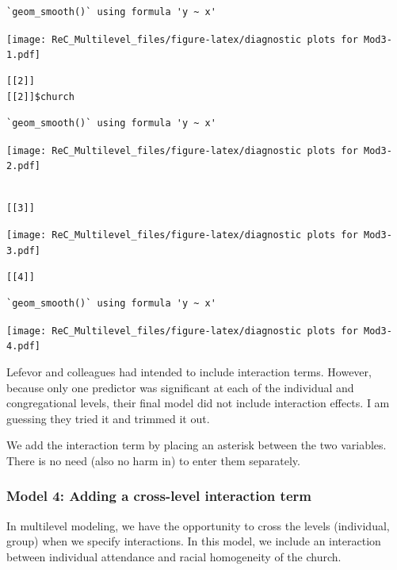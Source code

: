 \documentclass[
  11pt,
]{book}
\begin{document}
\begin{verbatim}
`geom_smooth()` using formula 'y ~ x'
\end{verbatim}

\texttt{[image: ReC\_Multilevel\_files/figure-latex/diagnostic plots for Mod3-1.pdf]}

\begin{verbatim}
[[2]]
[[2]]$church
\end{verbatim}

\begin{verbatim}
`geom_smooth()` using formula 'y ~ x'
\end{verbatim}

\texttt{[image: ReC\_Multilevel\_files/figure-latex/diagnostic plots for Mod3-2.pdf]}

\begin{verbatim}

[[3]]
\end{verbatim}

\texttt{[image: ReC\_Multilevel\_files/figure-latex/diagnostic plots for Mod3-3.pdf]}

\begin{verbatim}
[[4]]
\end{verbatim}

\begin{verbatim}
`geom_smooth()` using formula 'y ~ x'
\end{verbatim}

\texttt{[image: ReC\_Multilevel\_files/figure-latex/diagnostic plots for Mod3-4.pdf]}

Lefevor and colleagues \citep{lefevor_homonegativity_2020} had intended to include interaction terms. However, because only one predictor was significant at each of the individual and congregational levels, their final model did not include interaction effects. I am guessing they tried it and trimmed it out.

We add the interaction term by placing an asterisk between the two variables. There is no need (also no harm in) to enter them separately.

\hypertarget{model-4-adding-a-cross-level-interaction-term}{%
\subsubsection{Model 4: Adding a cross-level interaction term}\label{model-4-adding-a-cross-level-interaction-term}}

In multilevel modeling, we have the opportunity to cross the levels (individual, group) when we specify interactions. In this model, we include an interaction between individual attendance and racial homogeneity of the church.
\end{document}
